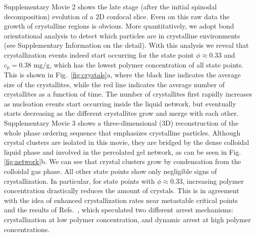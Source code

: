 \documentclass[preprint,amsmath,amssymb,superscriptaddress]{revtex4-1}
\begin{document}
Supplementary Movie 2 shows the late stage (after the initial spinodal decomposition) evolution of a 2D confocal slice. Even on this raw data the growth of crystalline regions is obvious. More quantitatively, we adopt bond orientational analysis to detect which particles are in crystalline environments~\cite{russo2013interplay} 
(see Supplementary Information on the detail). 
With this analysis we reveal that crystallization events indeed start occurring for the state point $\phi\approx 0.33$ and $c_p=0.38$ mg/g, which has the lowest
polymer concentration of all state points. This is shown in Fig.~\ref{fig:crystals}a, where the black line indicates the average size of the crystallites, 
while the red line indicates the average number of crystallites as a function of time. The number of crystallites first rapidly increases as nucleation events
start occurring inside the liquid network, but eventually starts decreasing as the different crystallites grow and merge with each other.  Supplementary Movie 3 shows a three-dimensional (3D) reconstruction  of the whole phase ordering sequence that emphasizes crystalline particles. Although crystal clusters are isolated in this movie, they are bridged by the dense colloidal liquid phase and involved in the percolated gel network, as can be seen in Fig. \ref{fig:network}b. 
We can see that crystal clusters grow by condensation from the colloidal gas phase. 
All other state points show only negligible signs of crystallization. In particular, for state points with $\phi\approx 0.33$, increasing
polymer concentration drastically reduces the amount of crystals. This is in agreement with the
idea of enhanced crystallization rates near metastable critical points~\cite{ten1997enhancement,olmsted1998spinodal} and the
results of Refs.~\cite{soga1999metastable,fortini2008crystallization,perez2011pathways},
which speculated two different arrest mechanisms: crystallization at low polymer concentration, and dynamic arrest at high polymer concentrations.
\end{document}
